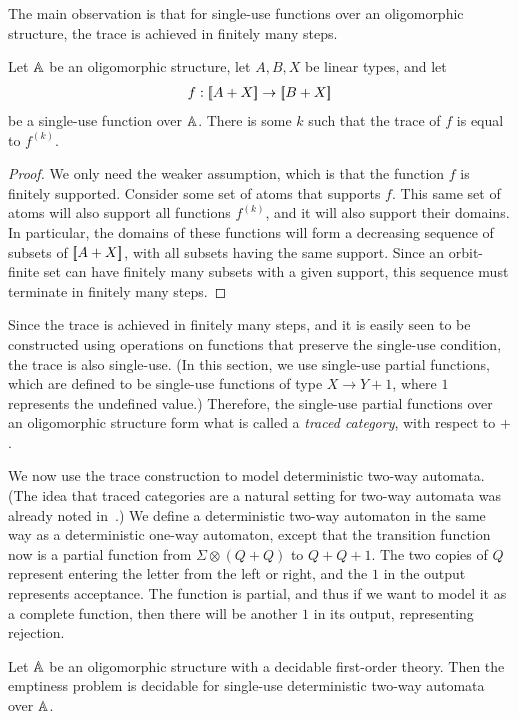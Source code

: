 The main observation is that for single-use functions over an oligomorphic structure, the trace is achieved in finitely many steps.
\begin{lemma}Let $\mathbb A$ be an oligomorphic structure, let $A,B,X$ be linear types, and let 
    \begin{align*}
        f : [{\kern-0.45ex}[A + X]{\kern-0.45ex}] \to [{\kern-0.45ex}[B + X]{\kern-0.45ex}]
        \end{align*}
        be a single-use function over $\mathbb A$. There is some $k$ such that the trace of $f$ is equal to $f^{(k)}$.
\end{lemma}
\begin{proof}
    We only need the weaker assumption, which is that the function $f$ is finitely supported. Consider some set of atoms that supports $f$. This same set of atoms will also support all functions $f^{(k)}$, and it will also support their domains. In particular, the domains of these functions will form a decreasing sequence of subsets of $[{\kern-0.45ex}[A + X]{\kern-0.45ex}]$, with all subsets having the same support. Since an orbit-finite set can have finitely many subsets with a given support, this sequence must terminate in finitely many steps.
\end{proof}

Since the trace is achieved in finitely many steps, and it is easily seen to be constructed using operations on functions that preserve the single-use condition, the trace is also single-use. (In this section, we use single-use partial functions, which are defined to be single-use functions of type $X \to Y +1$, where $1$ represents the undefined value.) Therefore, the single-use partial functions over an oligomorphic structure form what is called a \emph{traced category}, with respect to $+$. 



We now use the trace construction to model deterministic two-way automata. (The idea that traced categories are a natural setting for two-way automata was already noted in~\cite{hines2003categorical}.) We define a deterministic two-way automaton in the same way as a deterministic one-way automaton, except that the transition function now is a partial function from $\Sigma \otimes (Q + Q)$ to $Q + Q + 1$. 
The two copies of $Q$ represent entering the letter from the left or right, and the $1$ in the output represents acceptance.  The function is partial, and thus if we want to model it as a complete function, then there will be another $1$ in its output, representing rejection.

\begin{theorem}\label{thm:two-way-automata}
    Let $\mathbb A$ be an oligomorphic structure with a decidable first-order theory. Then the emptiness problem is decidable for single-use deterministic  two-way automata over $\mathbb A$.
\end{theorem}


